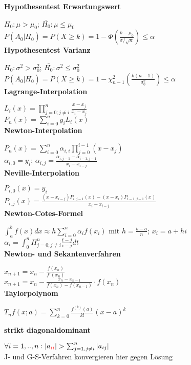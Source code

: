 \documentclass[10pt,twocolumn,a4paper]{article}
\begin{document}
\begin{flushleft}
\textbf{Hypothesentest Erwartungswert}

$H_0: \mu > \mu_0$; $\bar{H_0}: \mu \leq \mu_0$\\
$P(A_0|\bar{H_0}) = P(X \geq k) = 1 - \Phi(\frac{k-\mu_0}{\sigma / \sqrt{n}}) \leq \alpha$\\

\textbf{Hypothesentest Varianz}

$H_0: \sigma^2 > \sigma_0^2$; $\bar{H_0}: \sigma^2 \leq \sigma_0^2$\\
$P(A_0|\bar{H_0}) = P(X \geq k) = 1 - \chi^2_{n-1}(\frac{k(n-1)}{\sigma_0^2}) \leq \alpha$\\

\textbf{Lagrange-Interpolation}

$L_i(x) = \prod_{j=0;j \ne i}^n \frac{x-x_j}{x_i-x_j}$\\
$P_n(x) = \sum_{i=0}^n y_i L_i(x)$\\

\textbf{Newton-Interpolation}

$P_n(x) = \sum_{i=0}^n \alpha_{i,i} \prod_{j=0}^{i-1}(x-x_j)$\\
$\alpha_{i,0} = y_i$; $\alpha_{i,j} = \frac{\alpha_{i,j-1} - \alpha_{i-1,j-1}}{x_i - x_{i-j}}$\\

\textbf{Neville-Interpolation}

$P_{i,0}(x) = y_i$\\
$P_{i,j}(x) = \frac{(x-x_{i-j})P_{i,j-1}(x) - (x-x_i)P_{i-1,j-1}(x)}{x_i - x_{i-j}}$\\

\textbf{Newton-Cotes-Formel}

$\int_a^b f(x) dx \approx h \sum_{i=0}^n \alpha_i f(x_i)$ mit $h=\frac{b-a}{n}$; $x_i = a + hi$\\
$\alpha_i = \int_0^n \Pi_{j=0;j\neq i}^n \frac{t-j}{i-j} dt$\\

\textbf{Newton- und Sekantenverfahren}

$x_{n+1} = x_n - \frac{f(x_n)}{f'(x_n)}$\\
$x_{n+1} = x_n - \frac{x_n - x_{n-1}}{f(x_n) - f(x_{n-1})} \cdot f(x_n)$\\

\textbf{Taylorpolynom}

$ T_n f(x;a) = \sum_{k=0}^n \frac{f^{(k)}(a)}{k!}(x-a)^k $

\textbf{strikt diagonaldominant}

$\forall i = 1,..,n: |a_{\textcolor{red}{ii}}| > \sum_{j=1,j\neq i}^n |a_{ij}|$\\
J- und G-S-Verfahren konvergieren hier gegen Lösung\\


\end{flushleft}
\end{document}
